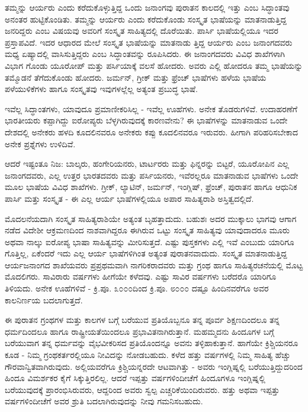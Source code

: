 ತಮ್ಮನ್ನು ಆರ್ಯರು ಎಂದು ಕರೆದುಕೊಳ್ಳುತ್ತಿದ್ದ ಒಂದು ಜನಾಂಗವು ಪುರಾತನ ಕಾಲದಲ್ಲಿ ಇತ್ತು ಎಂಬ ಸಿದ್ಧಾಂತವು ಅನಂತರ ಹುಟ್ಟಿಕೊಂಡಿತು. ತಮ್ಮನ್ನು ಆರ್ಯರು ಎಂದು ಕರೆದುಕೊಂಡು ಸಂಸ್ಕೃತ ಭಾಷೆಯನ್ನು ಮಾತನಾಡುತ್ತಿದ್ದ ಜನರಿದ್ದರು ಎಂಬ ವಿಷಯವು ಅವರಿಗೆ ಸಂಸ್ಕೃತ ಸಾಹಿತ್ಯದಲ್ಲಿ ದೊರೆಯಿತು. ಪಾರ್ಸಿ ಭಾಷೆಯಲ್ಲಿಯೂ ಇದರ ಪ್ರಸ್ತಾಪವಿದೆ. ಇದರ ಆಧಾರದ ಮೇಲೆ ಸಂಸ್ಕೃತ ಭಾಷೆಯನ್ನು ಮಾತನಾಡು ತ್ತಿದ್ದ ಆರ್ಯರು ಎಂಬ ಜನಾಂಗದವರು ಮಧ್ಯ ಏಷ್ಯಾದಲ್ಲಿ ವಾಸಿಸುತ್ತಿದ್ದರು ಎಂಬ ಸಿದ್ಧಾಂತವನ್ನು ರೂಪಿಸಿದರು. ಈ ಜನಾಂಗದವರು ವಿವಿಧ ಶಾಖೆಗಳಾಗಿ ವಿಭಾಗ ಗೊಂಡು ಯೂರೋಪ್ ಮತ್ತು ಪರ್ಸಿಯಾಕ್ಕೆ ವಲಸೆ ಹೋದರು. ಅವರು ಎಲ್ಲಿ ಹೋದರೂ ತಮ್ಮ ಭಾಷೆಯನ್ನು ತಮ್ಮೊಡನೆ ತೆಗೆದುಕೊಂಡು ಹೋದರು. ಜರ್ಮನ್, ಗ್ರೀಕ್ ಮತ್ತು ಫ್ರೆಂಚ್ ಭಾಷೆಗಳು ಹಳೆಯ ಭಾಷೆಯ ಪಳೆಯುಳಿಕೆಗಳು ಹಾಗೂ ಸಂಸ್ಕೃತವು ಇವುಗಳಲ್ಲೆಲ್ಲ ಅತ್ಯಂತ ಪ್ರಬುದ್ಧ ಭಾಷೆ.

ಇವೆಲ್ಲ ಸಿದ್ಧಾಂತಗಳು, ಯಾವುದೂ ಪ್ರಮಾಣೀಕರಿಸಿಲ್ಲ - ಇವೆಲ್ಲ ಊಹೆಗಳು. ಅನೇಕ ತೊಡರುಗಳಿವೆ. ಉದಾಹರಣೆಗೆ ಭಾರತೀಯರು ಕಪ್ಪಾಗಿದ್ದು ಐರೋಪ್ಯರು ಬೆಳ್ಳಗಿರುವುದಕ್ಕೆ ಕಾರಣವೇನು? ಈ ಭಾಷೆಗಳನ್ನು ಮಾತನಾಡುವ ಒಂದೇ ದೇಶದಲ್ಲಿ ಅನೇಕರು ಹಳದಿ ಕೂದಲಿನವರೂ ಅನೇಕರು ಕಪ್ಪು ಕೂದಲಿನವರೂ ಇರುವರು. ಹೀಗಾಗಿ ಪರಿಹರಿಸಬೇಕಾದ ಅನೇಕ ಪ್ರಶ್ನೆಗಳು ಉಳಿದಿವೆ.

ಆದರೆ ಇಷ್ಟಂತೂ ನಿಜ: ಬಾಲ್ಕರು, ಹಂಗೇರಿಯನರು, ಟಾರ್ಟರರು ಮತ್ತು ಫಿನ್ನರನ್ನು ಬಿಟ್ಟರೆ, ಯೂರೋಪಿನ ಎಲ್ಲ ಜನಾಂಗದವರು, ಎಲ್ಲ ಉತ್ತರ ಭಾರತದವರು ಮತ್ತು ಪರ್ಸಿಯನರು, ಇವೆರಲ್ಲರೂ ಮಾತನಾಡುವ ಭಾಷೆಗಳು ಒಂದೇ ಮೂಲ ಭಾಷೆಯ ವಿವಿಧ ಶಾಖೆಗಳು. ಗ್ರೀಕ್, ಲ್ಯಾಟಿನ್, ಜರ್ಮನ್, ಇಂಗ್ಲಿಷ್, ಫ್ರೆಂಚ್, ಪುರಾತನ ಹಾಗೂ ಆಧುನಿಕ ಪಾರ್ಸಿ ಮತ್ತು ಸಂಸ್ಕೃತ - ಈ ಎಲ್ಲ ಆರ್ಯ ಭಾಷೆಗಳಲ್ಲಿಯೂ ಅಪಾರ ಸಾಹಿತ್ಯರಾಶಿ ಅಸ್ತಿತ್ವದಲ್ಲಿದೆ.

ಮೊದಲನೆಯದಾಗಿ ಸಂಸ್ಕೃತ ಸಾಹಿತ್ಯರಾಶಿಯೇ ಅತ್ಯಂತ ಬೃಹತ್ತಾದುದು. ಬಹುಶಃ ಅದರ ಮುಕ್ಕಾಲು ಭಾಗವು ಆಗಾಗ ನಡೆದ ವಿದೇಶೀ ಆಕ್ರಮಣದಿಂದ ನಾಶವಾಗಿದ್ದರೂ ಈಗಿರುವ ಒಟ್ಟು ಸಂಸ್ಕೃತ ಸಾಹಿತ್ಯವು ಯಾವುದಾದರೂ ಮೂರು ಅಥವಾ ನಾಲ್ಕು ಐರೋಪ್ಯ ಭಾಷಾ ಸಾಹಿತ್ಯವನ್ನು ಮೀರಿಸುತ್ತದೆ. ಎಷ್ಟು ಪುಸ್ತಕಗಳು ಎಲ್ಲಿ ಇವೆ ಎಂಬುದು ಯಾರಿಗೂ ಗೊತ್ತಿಲ್ಲ, ಏಕೆಂದರೆ ಇದು ಎಲ್ಲ ಆರ್ಯ ಭಾಷೆಗಳಿಗಿಂತ ಅತ್ಯಂತ ಪುರಾತನವಾದುದು. ಸಂಸ್ಕೃತ ಮಾತನಾಡುತ್ತಿದ್ದ ಆರ್ಯಜನಾಂಗದ ಶಾಖೆಯವರು ಪ್ರಪ್ರಥಮವಾಗಿ ನಾಗರಿಕರಾದವರು ಮತ್ತು ಗ್ರಂಥ ಹಾಗೂ ಸಾಹಿತ್ಯರಚನೆಯಲ್ಲಿ ಮೊಟ್ಟ ಮೊದಲಿಗರು. ಸಾವಿರಾರು ವರ್ಷಗಳು ಹೀಗೆಯೇ ಕಳೆದವು. ಎಷ್ಟು ಸಾವಿರ ವರ್ಷಗಳು ಬರೆದರೊ ಯಾರಿಗೂ ತಿಳಿಯದು. ಅನೇಕ ಊಹೆಗಳಿವೆ - ಕ್ರಿ.ಪೂ. ೩೦೦೦ದಿಂದ ಕ್ರಿ.ಪೂ. ೮೦೦೦ ದಷ್ಟೂ ಹಿಂದಿನವರೆಗೂ ಅವರ ಕಾಲನಿರ್ಣಯ ಬದಲಾಗುತ್ತದೆ.

ಈ ಪುರಾತನ ಗ್ರಂಥಗಳ ಮತ್ತು ಕಾಲಗಳ ಬಗ್ಗೆ ಬರೆಯುವ ಪ್ರತಿಯೊಬ್ಬನೂ ತನ್ನ ಪೂರ್ವ ಶಿಕ್ಷಣದಿಂದಲೂ ತನ್ನ ಧರ್ಮದಿಂದಲೂ ಹಾಗೂ ರಾಷ್ಟ್ರೀಯತೆಯಿಂದಲೂ ಪ್ರಭಾವಿತನಾಗಿರುತ್ತಾನೆ. ಮಹಮ್ಮದನು ಹಿಂದೂಗಳ ಬಗ್ಗೆ ಬರೆಯುವಾಗ ತನ್ನ ಧರ್ಮವನ್ನು ವೈಭವೀಕರಿಸದ ಪ್ರತಿಯೊಂದನ್ನೂ ಅವನು ತಳ್ಳಿಹಾಕುತ್ತಾನೆ. ಹಾಗೆಯೇ ಕ್ರಿಶ್ಚಿಯನರೂ ಕೂಡ - ನಿಮ್ಮ ಗ್ರಂಥಕರ್ತರಲ್ಲಿಯೂ ನೀವಿದನ್ನು ನೋಡಬಹುದು. ಕಳೆದ ಹತ್ತು ವರ್ಷಗಳಲ್ಲಿ ನಿಮ್ಮ ಸಾಹಿತ್ಯ ಹೆಚ್ಚು ಗೌರವಾನ್ವಿತವಾಗಿರುವುದು. ಅಲ್ಲಿಯವರೆಗೂ ಕ್ರಿಶ್ಚಿಯನ್ನರದೇ ಆಟವಾಗಿತ್ತು - ಅವರು ಇಂಗ್ಲಿಷ್ನಲ್ಲಿ ಬರೆಯುತ್ತಿದ್ದುದರಿಂದ ಹಿಂದೂ ವಿಮರ್ಶಕರ ಕೈಗೆ ಸಿಕ್ಕುತ್ತಿರಲಿಲ್ಲ. ಆದರೆ ಇಪ್ಪತ್ತು ವರ್ಷಗಳಿಂದೀಚೆಗೆ ಹಿಂದೂಗಳೂ ಇಂಗ್ಲಿಷ್ನಲ್ಲಿ ಬರೆಯುವುದಕ್ಕೆ ಪ್ರಾರಂಭಿಸಿರುವರು, ಆದ್ದರಿಂದ ಅವರು ಸ್ವಲ್ಪ ಎಚ್ಚರಿಕೆಯಿಂದಿರುವರು. ಹತ್ತು ಅಥವಾ ಇಪ್ಪತ್ತು ವರ್ಷಗಳಿಂದೀಚೆಗೆ ಅವರ ಶ್ರುತಿ ಬದಲಾಗಿರುವುದನ್ನು ನೀವು ಗಮನಿಸಬಹುದು.

